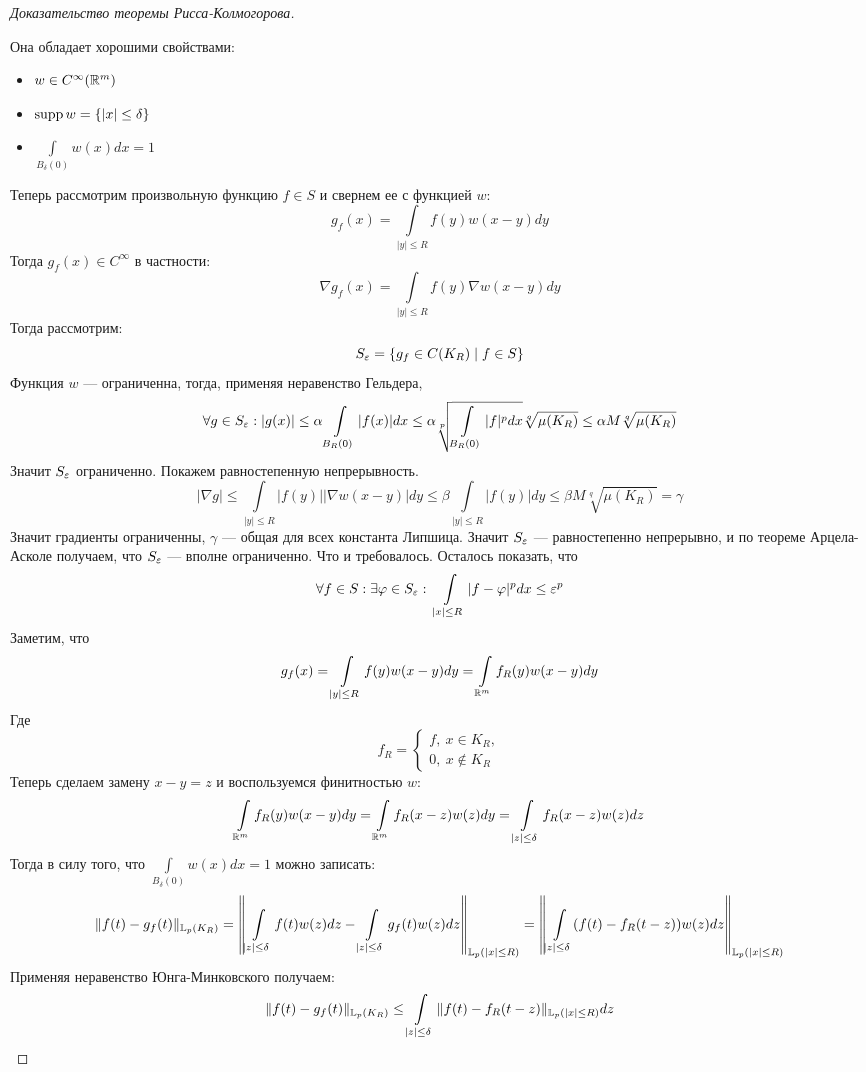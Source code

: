 \begin{proof}[Доказательство теоремы Рисса-Колмогорова]
\begin{center}
	\end{center}
	Она обладает хорошими свойствами: 
	\begin{itemize}
		\item $ w \in C^\infty(\mathbb{R}^m)$
		\item $\operatorname{supp} w = \{|x| \leq \delta\}$
		\item $\int\limits_{B_{\delta}(0)} w(x) dx = 1$
	\end{itemize}
	Теперь рассмотрим произвольную функцию $f \in S$ и свернем ее с функцией $w$:
	$$
	g_f(x) = \int\limits_{|y| \leq R} f(y)w(x-y)dy
	$$
	Тогда $g_f(x) \in C^\infty$ в частности:
	$$
	\nabla g_f(x) = \int\limits_{|y| \leq R} f(y) \nabla w (x-y) dy 
	$$ 
	Тогда рассмотрим:
	$$
	S_\varepsilon = \{g_f \in C(K_R) \mid f \in S\}
	$$
	Функция $w$ ---  ограниченна, тогда, применяя неравенство Гельдера, 	
	$$
	\forall g \in S_\varepsilon: |g(x)| \leq \alpha \int\limits_{B_{R}(0)} |f(x)|dx \leq \alpha \sqrt[p]{\int\limits_{B_{R}(0)}|f|^pdx} \sqrt[q]{\mu(K_R)} \leq \alpha M \sqrt[q]{\mu(K_R)}
	$$
	Значит $S_\varepsilon$ ограниченно. Покажем равностепенную непрерывность. 
	$$
	|\nabla g| \leq \int\limits_{|y| \leq R} |f(y)| |\nabla w (x-y)| dy \leq \beta \int\limits_{|y| \leq R} |f(y)| dy \leq \beta M \sqrt[q]{\mu(K_R)} = \gamma
	$$
	Значит градиенты ограниченны, $\gamma$ --- общая для всех константа Липшица. Значит $S_\varepsilon$ --- равностепенно непрерывно, и по теореме Арцела-Асколе получаем, что $S_\varepsilon$ --- вполне ограниченно. Что и требовалось. Осталось показать, что 
	$$
	\forall f \in S: \exists \varphi \in S_\varepsilon: \ \int\limits_{|x| \leq R} |f - \varphi|^p dx \leq \varepsilon^p
	$$
	Заметим, что 
	$$
	g_f(x) = \int\limits_{|y| \leq R}f(y)w(x-y)dy = \int\limits_{\mathbb{R}^m}f_R(y)w(x-y)dy
	$$
	Где
	$$
	f_R = \begin{cases}
		f, \ x \in K_R, \\
		0, \ x \notin K_R
	\end{cases}
	$$
	Теперь сделаем замену $x - y = z$ и воспользуемся финитностью $w$:
	$$
	\int\limits_{\mathbb{R}^m}f_R(y)w(x-y)dy = \int\limits_{\mathbb{R}^m}f_R(x-z)w(z)dy = \int\limits_{|z| \leq \delta}f_R(x-z)w(z)dz 
	$$
	Тогда в силу того, что $\int\limits_{B_{\delta}(0)} w(x) dx = 1$ можно записать:
	$$
	\|f(t) - g_f(t)\|_{\mathbb{L}_p(K_R)} = \left\|\int\limits_{|z| \leq \delta} f(t)w(z)dz - \int\limits_{|z| \leq \delta} g_f(t) w(z) dz\right\|_{\mathbb{L}_p(|x|\leq R)}  = \left\| \int\limits_{|z| \leq \delta} (f(t) - f_R(t-z))w(z)dz\right\|_{\mathbb{L}_p(|x| \leq R)}
	$$
	Применяя неравенство Юнга-Минковского получаем:
	$$
	\|f(t) - g_f(t)\|_{\mathbb{L}_p(K_R)}  \leq \int\limits_{|z| \leq \delta} \|f(t) - f_R(t -z)\|_{\mathbb{L}_p(|x| \leq R)} dz
$$
\end{proof}
